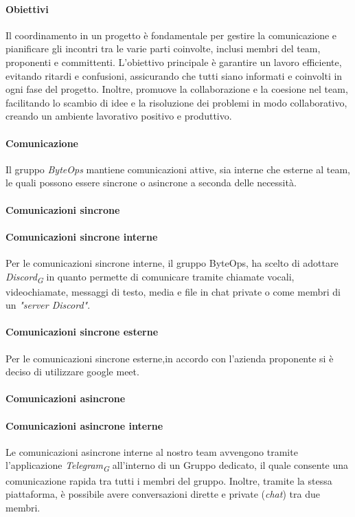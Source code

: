 \paragraph{Obiettivi}
Il coordinamento in un progetto è fondamentale per gestire la comunicazione e pianificare gli incontri tra le varie parti coinvolte, inclusi membri del team, proponenti e committenti. L'obiettivo principale è garantire un lavoro efficiente, evitando ritardi e confusioni, assicurando che tutti siano informati e coinvolti in ogni fase del progetto. Inoltre, promuove la collaborazione e la coesione nel team, facilitando lo scambio di idee e la risoluzione dei problemi in modo collaborativo, creando un ambiente lavorativo positivo e produttivo.

\paragraph*{Comunicazione}
Il gruppo \textit{ByteOps} mantiene comunicazioni attive, sia interne che esterne al team, le quali possono essere sincrone o asincrone a seconda delle necessità.
\paragraph{Comunicazioni sincrone}
\paragraph*{Comunicazioni sincrone interne}
Per le comunicazioni sincrone interne, il gruppo ByteOps, ha scelto di adottare \textit{Discord}\textsubscript{\textit{G}} in quanto permette di comunicare tramite chiamate vocali, videochiamate, messaggi di testo, media e file in chat private o come membri di un \textit{"server Discord"}.
\paragraph*{Comunicazioni sincrone esterne}
Per le comunicazioni sincrone esterne,in accordo con l'azienda proponente si è deciso di utilizzare google meet.
\paragraph{Comunicazioni asincrone}
\paragraph*{Comunicazioni asincrone interne}
Le comunicazioni asincrone interne al nostro team avvengono tramite l'applicazione \textit{Telegram}\textsubscript{\textit{G}} all'interno di un Gruppo dedicato, il quale consente una comunicazione rapida tra tutti i membri del gruppo. Inoltre, tramite la stessa piattaforma, è possibile avere conversazioni dirette e private (\textit{chat}) tra due membri.
